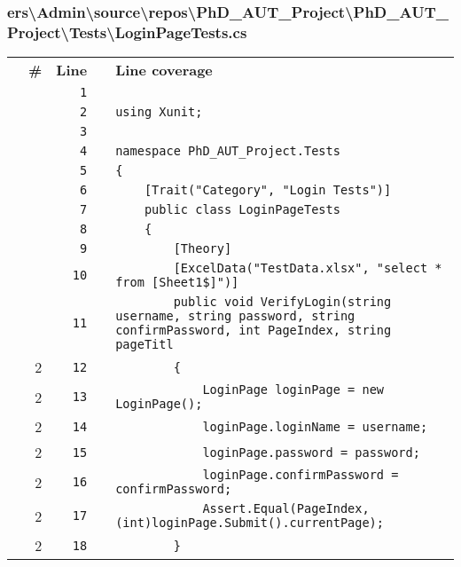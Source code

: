 \documentclass[a4paper,landscape,10pt]{article}
\begin{document}
\subsubsection{ers\textbackslash Admin\textbackslash source\textbackslash repos\textbackslash PhD\_AUT\_Project\textbackslash PhD\_AUT\_Project\textbackslash Tests\textbackslash LoginPageTests.cs}
\begin{longtable}[l]{lrrll}
\textbf{} & \textbf{\#} & \textbf{Line} & \textbf{} & \textbf{Line coverage}\\
\cellcolor{gray} &  & \verb~1~ & & \verb~~\\
\cellcolor{gray} &  & \verb~2~ & & \verb~using Xunit;~\\
\cellcolor{gray} &  & \verb~3~ & & \verb~~\\
\cellcolor{gray} &  & \verb~4~ & & \verb~namespace PhD_AUT_Project.Tests~\\
\cellcolor{gray} &  & \verb~5~ & & \verb~{~\\
\cellcolor{gray} &  & \verb~6~ & & \verb~    [Trait("Category", "Login Tests")]~\\
\cellcolor{gray} &  & \verb~7~ & & \verb~    public class LoginPageTests~\\
\cellcolor{gray} &  & \verb~8~ & & \verb~    {~\\
\cellcolor{gray} &  & \verb~9~ & & \verb~        [Theory]~\\
\cellcolor{gray} &  & \verb~10~ & & \verb~        [ExcelData("TestData.xlsx", "select * from [Sheet1$]")]~\\
\cellcolor{gray} &  & \verb~11~ & & \verb~        public void VerifyLogin(string username, string password, string confirmPassword, int PageIndex, string pageTitl~\\
\cellcolor{green} & 2 & \verb~12~ & & \verb~        {~\\
\cellcolor{green} & 2 & \verb~13~ & & \verb~            LoginPage loginPage = new LoginPage();~\\
\cellcolor{green} & 2 & \verb~14~ & & \verb~            loginPage.loginName = username;~\\
\cellcolor{green} & 2 & \verb~15~ & & \verb~            loginPage.password = password;~\\
\cellcolor{green} & 2 & \verb~16~ & & \verb~            loginPage.confirmPassword = confirmPassword;~\\
\cellcolor{green} & 2 & \verb~17~ & & \verb~            Assert.Equal(PageIndex, (int)loginPage.Submit().currentPage);~\\
\cellcolor{green} & 2 & \verb~18~ & & \verb~        }~\\

\end{longtable}
\end{document}
